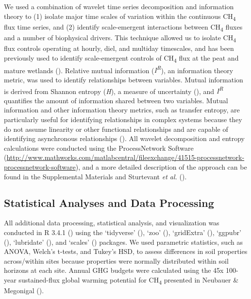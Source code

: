 \documentclass[
  12pt,
]{article}
\begin{document}
We used a combination of wavelet time series decomposition and
information theory to (1) isolate major time scales of variation within
the continuous CH\textsubscript{4} flux time series, and (2) identify
scale-emergent interactions between CH\textsubscript{4} fluxes and a
number of biophysical drivers. This technique allowed us to isolate
CH\textsubscript{4} flux controls operating at hourly, diel, and
multiday timescales, and has been previously used to identify
scale-emergent controls of CH\textsubscript{4} flux at the peat and
mature wetlands (). Relative mutual information
(\emph{I\textsuperscript{R}}), an information theory metric, was used to
identify relationships between variables. Mutual information is derived
from Shannon entropy (\emph{H}), a measure of uncertainty
(), and
\emph{I\textsuperscript{R}} quantifies the amount of information shared
between two variables. Mutual information and other information theory
metrics, such as transfer entropy, are particularly useful for
identifying relationships in complex systems because they do not assume
linearity or other functional relationships and are capable of
identifying asynchronous relationships
(). All
wavelet decomposition and entropy calculations were conducted using the
ProcessNetwork Software
(\url{http://www.mathworks.com/matlabcentral/fileexchange/41515-processnetwork-processnetwork-software}),
and a more detailed description of the approach can be found in the
Supplemental Materials and Sturtevant \emph{et al.}
().

\subsection{Statistical Analyses and Data
Processing}\label{statistical-analyses-and-data-processing}

All additional data processing, statistical analysis, and visualization
was conducted in R 3.4.1 ()
using the `tidyverse' (), `zoo'
(), `gridExtra'
(), `ggpubr'
(), `lubridate'
(), and `scales'
() packages. We used parametric
statistics, such as ANOVA, Welch's t-tests, and Tukey's HSD, to assess
differences in soil properties across/within sites because properties
were normally distributed within soil horizons at each site. Annual GHG
budgets were calculated using the 45x 100-year sustained-flux global
warming potential for CH\textsubscript{4} presented in Neubauer \&
Megonigal ().
\end{document}
